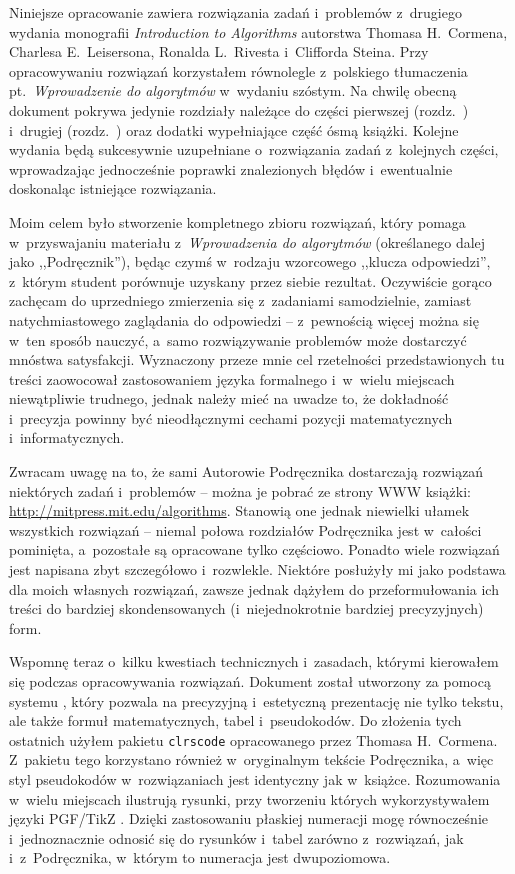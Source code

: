 
Niniejsze opracowanie zawiera rozwiązania zadań i~problemów z~drugiego wydania monografii \textsl{Introduction to Algorithms} \cite{cormen} autorstwa Thomasa H.\ Cormena, Charlesa E.\ Leisersona, Ronalda L.\ Rivesta i~Clifforda Steina.
Przy opracowywaniu rozwiązań korzystałem równolegle z~polskiego tłumaczenia pt.\ \textsl{Wprowadzenie do algorytmów} \cite{cormenpl} w~wydaniu szóstym.
Na chwilę obecną dokument pokrywa jedynie rozdziały należące do części pierwszej (rozdz.\ ) i~drugiej (rozdz.\ ) oraz dodatki wypełniające część ósmą książki.
Kolejne wydania będą sukcesywnie uzupełniane o~rozwiązania zadań z~kolejnych części, wprowadzając jednocześnie poprawki znalezionych błędów i~ewentualnie doskonaląc istniejące rozwiązania.

Moim celem było stworzenie kompletnego zbioru rozwiązań, który pomaga w~przyswajaniu materiału z~\textsl{Wprowadzenia do algorytmów} (określanego dalej jako ,,Podręcznik''), będąc czymś w~rodzaju wzorcowego ,,klucza odpowiedzi'', z~którym student porównuje uzyskany przez siebie rezultat.
Oczywiście gorąco zachęcam do uprzedniego zmierzenia się z~zadaniami samodzielnie, zamiast natychmiastowego zaglądania do odpowiedzi -- z~pewnością więcej można się w~ten sposób nauczyć, a~samo rozwiązywanie problemów może dostarczyć mnóstwa satysfakcji.
Wyznaczony przeze mnie cel rzetelności przedstawionych tu treści zaowocował zastosowaniem języka formalnego i~w~wielu miejscach niewątpliwie trudnego, jednak należy mieć na uwadze to, że dokładność i~precyzja powinny być nieodłącznymi cechami pozycji matematycznych i~informatycznych.

Zwracam uwagę na to, że sami Autorowie Podręcznika dostarczają rozwiązań niektórych zadań i~problemów -- można je pobrać ze strony WWW książki: \url{http://mitpress.mit.edu/algorithms}.
Stanowią one jednak niewielki ułamek wszystkich rozwiązań -- niemal połowa rozdziałów Podręcznika jest w~całości pominięta, a~pozostałe są opracowane tylko częściowo.
Ponadto wiele rozwiązań jest napisana zbyt szczegółowo i~rozwlekle.
Niektóre posłużyły mi jako podstawa dla moich własnych rozwiązań, zawsze jednak dążyłem do przeformułowania ich treści do bardziej skondensowanych (i~niejednokrotnie bardziej precyzyjnych) form.

Wspomnę teraz o~kilku kwestiach technicznych i~zasadach, którymi kierowałem się podczas opracowywania rozwiązań.
Dokument został utworzony za pomocą systemu \LaTeXe, który pozwala na precyzyjną i~estetyczną prezentację nie tylko tekstu, ale także formuł matematycznych, tabel i~pseudokodów.
Do złożenia tych ostatnich użyłem pakietu \texttt{clrscode} opracowanego przez Thomasa H.\ Cormena.
Z~pakietu tego korzystano również w~oryginalnym tekście Podręcznika, a~więc styl pseudokodów w~rozwiązaniach jest identyczny jak w~książce.
Rozumowania w~wielu miejscach ilustrują rysunki, przy tworzeniu których wykorzystywałem języki PGF/TikZ \cite{pgfmanual}.
Dzięki zastosowaniu płaskiej numeracji mogę równocześnie i~jednoznacznie odnosić się do rysunków i~tabel zarówno z~rozwiązań, jak i~z~Podręcznika, w~którym to numeracja jest dwupoziomowa.

